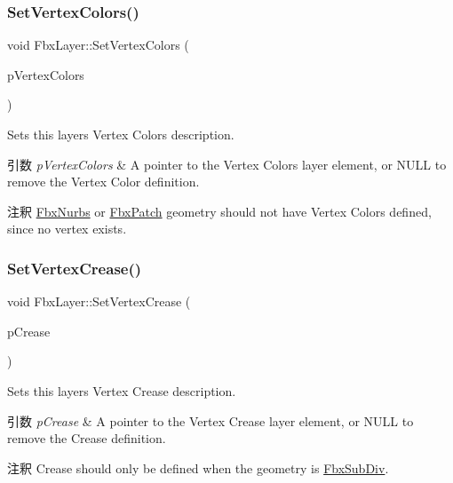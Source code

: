 \subsubsection{\texorpdfstring{Set\+Vertex\+Colors()}{SetVertexColors()}}
{\footnotesize\ttfamily void Fbx\+Layer\+::\+Set\+Vertex\+Colors (\begin{DoxyParamCaption}\item[{\hyperlink{class_fbx_layer_element_vertex_color}{Fbx\+Layer\+Element\+Vertex\+Color} $\ast$}]{p\+Vertex\+Colors }\end{DoxyParamCaption})}

Sets this layer\textquotesingle{}s Vertex Colors description. 
\begin{DoxyParams}{引数}
{\em p\+Vertex\+Colors} & A pointer to the Vertex Colors layer element, or {\ttfamily N\+U\+LL} to remove the Vertex Color definition. \\
\hline
\end{DoxyParams}
\begin{DoxyRemark}{注釈}
\hyperlink{class_fbx_nurbs}{Fbx\+Nurbs} or \hyperlink{class_fbx_patch}{Fbx\+Patch} geometry should not have Vertex Colors defined, since no vertex exists. 
\end{DoxyRemark}
\mbox{\label{class_fbx_layer_a3412e33c666589f00a19ac3b0ddc91a3}} 
\subsubsection{\texorpdfstring{Set\+Vertex\+Crease()}{SetVertexCrease()}}
{\footnotesize\ttfamily void Fbx\+Layer\+::\+Set\+Vertex\+Crease (\begin{DoxyParamCaption}\item[{\hyperlink{class_fbx_layer_element_crease}{Fbx\+Layer\+Element\+Crease} $\ast$}]{p\+Crease }\end{DoxyParamCaption})}

Sets this layer\textquotesingle{}s Vertex Crease description. 
\begin{DoxyParams}{引数}
{\em p\+Crease} & A pointer to the Vertex Crease layer element, or {\ttfamily N\+U\+LL} to remove the Crease definition. \\
\hline
\end{DoxyParams}
\begin{DoxyRemark}{注釈}
Crease should only be defined when the geometry is \hyperlink{class_fbx_sub_div}{Fbx\+Sub\+Div}. 
\end{DoxyRemark}
\mbox{\label{class_fbx_layer_a41ca8570422586a5656c6848c2ae2971}} 
